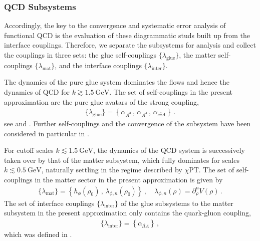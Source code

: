 \documentclass[aps,twocolumn,prd,superscriptaddress]{revtex4-2}
\begin{document}
\subsubsection{QCD Subsystems} 
\label{sec:QCDsubsystems}

Accordingly, the key to the convergence and systematic error analysis of functional QCD is the evaluation of these diagrammatic studs built up from the interface couplings. Therefore, we separate the subsystems for analysis and collect the couplings in three sets: the glue self-couplings $\{\lambda_\textrm{glue}\}$, the matter self-couplings $\{\lambda_\textrm{mat}\}$, and the interface couplings $\{\lambda_\textrm{inter}\}$.

The dynamics of the pure glue system dominates the flows and hence the dynamics of QCD for $k\gtrsim \qty{1.5}{\GeV}$. The set of self-couplings in the present approximation are the pure glue avatars of the strong coupling, 
%
\begin{align} 
	\{\lambda_\textrm{glue}\}	=\left\{ \alpha_{A^3}\,,\,\alpha_{A^4}\,,\, \alpha_{c \bar c A}\right\}\,. 
	\label{eq:lambdaGlue}
\end{align} 
%
see  and . Further self-couplings and the convergence of the subsystem have been considered in particular in \cite{Mitter:2014wpa, Cyrol:2016tym, Cyrol:2017qkl, Corell:2018yil}. 

For cutoff scales $k\lesssim \qty{1.5}{\GeV}$, the dynamics of the QCD system is successively taken over by that of the matter subsystem, which fully dominates for scales $k\lesssim \qty{0.5}{\GeV}$, naturally settling in the regime described by $\chi$PT. The set of self-couplings in the matter sector in the present approximation is given by 
%
\begin{align} 
	\{\lambda_\textrm{mat}\}	=\left\{h_\phi(\rho_0)\,,\, \lambda_{\phi,n}(\rho_0) \right\}\,, \quad \lambda_{\phi,n}(\rho) = \partial_\rho^n V(\rho) \,. 
	\label{eq:lambdaMatter}
\end{align} 
% 
The set of interface couplings $\{\lambda_\textrm{inter}\} $ of the glue subsystems to the matter subsystem in the present approximation only contains the quark-gluon coupling, 
%
\begin{align}
	\{\lambda_\textrm{inter}\} = \left\{\alpha_{l\bar l A}\right\}\,,
	\label{eq:lambdaInter}
\end{align}
%
which was defined in .
\end{document}
